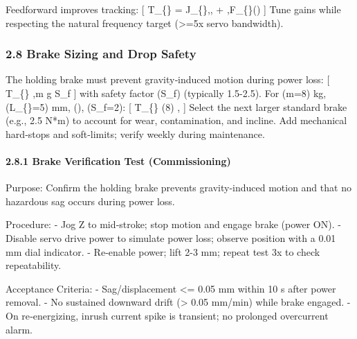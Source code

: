 \documentclass[
]{article}
\begin{document}
Feedforward improves tracking: {[} T\_\{\} =
J\_\{\},, +
,F\_\{\}() {]}
Tune gains while respecting the natural frequency target
(\textgreater=5x servo bandwidth).

\subsubsection{2.8 Brake Sizing and Drop
Safety}\label{brake-sizing-and-drop-safety}

The holding brake must prevent gravity‑induced motion during power loss:
{[} T\_\{\} \ge {},m g
\times S\_f {]} with safety factor (S\_f) (typically 1.5-2.5). For (m=8)
kg, (L\_\{\}=5) mm, (), (S\_f=2): {[}
T\_\{\} \ge {} (8)
 , {]} Select the next larger standard
brake (e.g., 2.5 N*m) to account for wear, contamination, and incline.
Add mechanical hard‑stops and soft‑limits; verify weekly during
maintenance.

\paragraph{2.8.1 Brake Verification Test
(Commissioning)}\label{brake-verification-test-commissioning}

Purpose: Confirm the holding brake prevents gravity‑induced motion and
that no hazardous sag occurs during power loss.

Procedure: - Jog Z to mid‑stroke; stop motion and engage brake (power
ON). - Disable servo drive power to simulate power loss; observe
position with a 0.01 mm dial indicator. - Re‑enable power; lift 2-3 mm;
repeat test 3x to check repeatability.

Acceptance Criteria: - Sag/displacement \textless= 0.05 mm within 10 s
after power removal. - No sustained downward drift (\textgreater{} 0.05
mm/min) while brake engaged. - On re‑energizing, inrush current spike is
transient; no prolonged overcurrent alarm.
\end{document}
